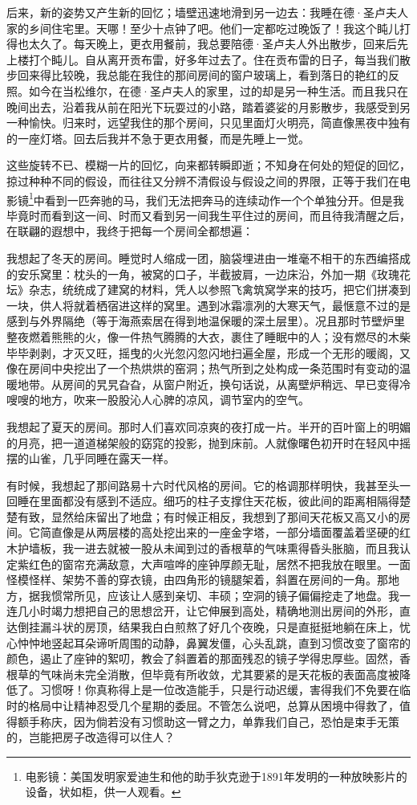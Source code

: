 \par 后来，新的姿势又产生新的回忆；墙壁迅速地滑到另一边去：我睡在德·圣卢夫人家的乡间住宅里。天哪！至少十点钟了吧。他们一定都吃过晚饭了！我这个盹儿打得也太久了。每天晚上，更衣用餐前，我总要陪德·圣卢夫人外出散步，回来后先上楼打个盹儿。自从离开贡布雷，好多年过去了。住在贡布雷的日子，每当我们散步回来得比较晚，我总能在我住的那间房间的窗户玻璃上，看到落日的艳红的反照。如今在当松维尔，在德·圣卢夫人的家里，过的却是另一种生活。而且我只在晚间出去，沿着我从前在阳光下玩耍过的小路，踏着婆娑的月影散步，我感受到另一种愉快。归来时，远望我住的那个房间，只见里面灯火明亮，简直像黑夜中独有的一座灯塔。回去后我并不急于更衣用餐，而是先睡上一觉。
\par 这些旋转不已、模糊一片的回忆，向来都转瞬即逝；不知身在何处的短促的回忆，掠过种种不同的假设，而往往又分辨不清假设与假设之间的界限，正等于我们在电影镜\footnote{电影镜：美国发明家爱迪生和他的助手狄克逊于1891年发明的一种放映影片的设备，状如柜，供一人观看。}中看到一匹奔驰的马，我们无法把奔马的连续动作一个个单独分开。但是我毕竟时而看到这一间、时而又看到另一间我生平住过的房间，而且待我清醒之后，在联翩的遐想中，我终于把每一个房间全都想遍：
\par 我想起了冬天的房间。睡觉时人缩成一团，脑袋埋进由一堆毫不相干的东西编搭成的安乐窝里：枕头的一角，被窝的口子，半截披肩，一边床沿，外加一期《玫瑰花坛》杂志，统统成了建窝的材料，凭人以参照飞禽筑窝学来的技巧，把它们拼凑到一块，供人将就着栖宿进这样的窝里。遇到冰霜凛冽的大寒天气，最惬意不过的是感到与外界隔绝（等于海燕索居在得到地温保暖的深土层里）。况且那时节壁炉里整夜燃着熊熊的火，像一件热气腾腾的大衣，裹住了睡眠中的人；没有燃尽的木柴毕毕剥剥，才灭又旺，摇曳的火光忽闪忽闪地扫遍全屋，形成一个无形的暖阁，又像在房间中央挖出了一个热烘烘的窑洞；热气所到之处构成一条范围时有变动的温暖地带。从房间的旯旯旮旮，从窗户附近，换句话说，从离壁炉稍远、早已变得冷嗖嗖的地方，吹来一股股沁人心脾的凉风，调节室内的空气。
\par 我想起了夏天的房间。那时人们喜欢同凉爽的夜打成一片。半开的百叶窗上的明媚的月亮，把一道道梯架般的窈窕的投影，抛到床前。人就像曙色初开时在轻风中摇摆的山雀，几乎同睡在露天一样。
\par 有时候，我想起了那间路易十六时代风格的房间。它的格调那样明快，我甚至头一回睡在里面都没有感到不适应。细巧的柱子支撑住天花板，彼此间的距离相隔得楚楚有致，显然给床留出了地盘；有时候正相反，我想到了那间天花板又高又小的房间。它简直像是从两层楼的高处挖出来的一座金字塔，一部分墙面覆盖着坚硬的红木护墙板，我一进去就被一股从未闻到过的香根草的气味熏得昏头胀脑，而且我认定紫红色的窗帘充满敌意，大声喧哗的座钟厚颜无耻，居然不把我放在眼里。一面怪模怪样、架势不善的穿衣镜，由四角形的镜腿架着，斜置在房间的一角。那地方，据我惯常所见，应该让人感到亲切、丰硕；空洞的镜子偏偏挖走了地盘。我一连几小时竭力想把自己的思想岔开，让它伸展到高处，精确地测出房间的外形，直达倒挂漏斗状的房顶，结果我白白煎熬了好几个夜晚，只是直挺挺地躺在床上，忧心忡忡地竖起耳朵谛听周围的动静，鼻翼发僵，心头乱跳，直到习惯改变了窗帘的颜色，遏止了座钟的絮叨，教会了斜置着的那面残忍的镜子学得忠厚些。固然，香根草的气味尚未完全消散，但毕竟有所收敛，尤其要紧的是天花板的表面高度被降低了。习惯呀！你真称得上是一位改造能手，只是行动迟缓，害得我们不免要在临时的格局中让精神忍受几个星期的委屈。不管怎么说吧，总算从困境中得救了，值得额手称庆，因为倘若没有习惯助这一臂之力，单靠我们自己，恐怕是束手无策的，岂能把房子改造得可以住人？
